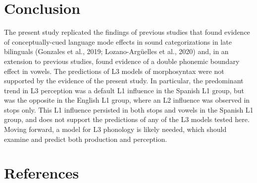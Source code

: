 \documentclass[
  man]{apa6}
\begin{document}
\hypertarget{conclusion}{%
\section{Conclusion}\label{conclusion}}

The present study replicated the findings of previous studies that found evidence of conceptually-cued language mode effects in sound categorizations in late bilinguals (Gonzales et al., 2019; Lozano-Argüelles et al., 2020) and, in an extension to previous studies, found evidence of a double phonemic boundary effect in vowels.
The predictions of L3 models of morphosyntax were not supported by the evidence of the present study. In particular, the predominant trend in L3 perception was a default L1 influence in the Spanish L1 group, but was the opposite in the English L1 group, where an L2 influence was observed in stops only.
This L1 influence persisted in both stops and vowels in the Spanish L1 group, and does not support the predictions of any of the L3 models tested here. Moving forward, a model for L3 phonology is likely needed, which should examine and predict both production and perception.

\hypertarget{references}{%
\section{References}\label{references}}

\begingroup
\setlength{\parindent}{-0.5in}
\setlength{\leftskip}{0.5in}
\end{document}
